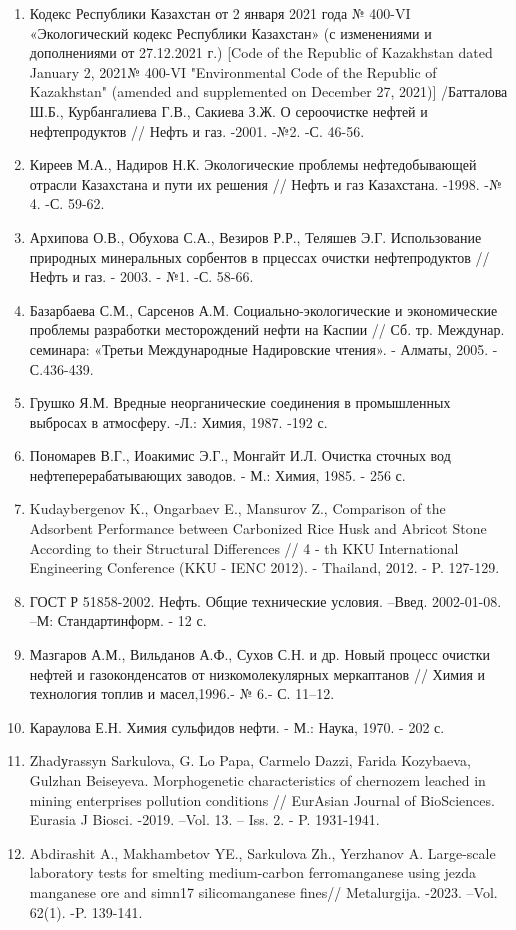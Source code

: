\begin{enumerate}
\def\labelenumi{\arabic{enumi}.}
\item
  Кодекс Республики Казахстан от 2 января 2021 года № 400-VI
  «Экологический кодекс Республики Казахстан» (с изменениями и
  дополнениями от 27.12.2021 г.) {[}Code of the Republic of Kazakhstan
  dated January 2, 2021№ 400-VI "Environmental Code of the Republic of
  Kazakhstan" (amended and supplemented on December 27, 2021){]}
  /Батталова Ш.Б., Курбангалиева Г.В., Сакиева З.Ж. О сероочистке нефтей
  и нефтепродуктов // Нефть и газ. -2001. -№2. -С. 46-56.
\item
  Киреев М.А., Надиров Н.К. Экологические проблемы нефтедобывающей
  отрасли Казахстана и пути их решения // Нефть и газ Казахстана. -1998.
  -№ 4. -С. 59-62.
\item
  Архипова О.В., Обухова С.А., Везиров Р.Р., Теляшев Э.Г. Использование
  природных минеральных сорбентов в прцессах очистки нефтепродуктов //
  Нефть и газ. - 2003. - №1. -С. 58-66.
\item
  Базарбаева С.М., Сарсенов А.М. Социально-экологические и экономические
  проблемы разработки месторождений нефти на Каспии // Сб. тр. Междунар.
  семинара: «Третьи Международные Надировские чтения». - Алматы, 2005. -
  С.436-439.
\item
  Грушко Я.М. Вредные неорганические соединения в промышленных выбросах
  в атмосферу. -Л.: Химия, 1987. -192 с.
\item
  Пономарев В.Г., Иоакимис Э.Г., Монгайт И.Л. Очистка сточных вод
  нефтеперерабатывающих заводов. - М.: Химия, 1985. - 256 с.
\item
  Kudaybergenov K., Ongarbaev E., Mansurov Z., Comparison of the
  Adsorbent Performance between Carbonized Rice Husk and Abricot Stone
  According to their Structural Differences // 4 - th KKU International
  Engineering Conference (KKU - IENC 2012). - Thailand, 2012. - P.
  127-129.
\item
  ГОСТ Р 51858-2002. Нефть. Общие технические условия. --Введ.
  2002-01-08. --М: Стандартинформ. - 12 с.
\item
  Мазгаров А.М., Вильданов А.Ф., Сухов С.Н. и др. Новый процесс очистки
  нефтей и газоконденсатов от низкомолекулярных меркаптанов // Химия и
  технология топлив и масел,1996.- № 6.- С. 11--12.
\item
  Караулова Е.Н. Химия сульфидов нефти. - М.: Наука, 1970. - 202 с.
\item
  Zhadуrassyn Sarkulova, G. Lo Papa, Carmelo Dazzi, Farida Kozybaeva,
  Gulzhan Beiseyeva. Morphogenetic characteristics of chernozem leached
  in mining enterprises pollution conditions // EurAsian Journal of
  BioSciences. Eurasia J Biosci. -2019. --Vol. 13. -- Iss. 2. - P.
  1931-1941.
\item
  Abdirashit A., Makhambetov YE., Sarkulova Zh., Yerzhanov A.
  Large-scale laboratory tests for smelting medium-carbon ferromanganese
  using jezda manganese ore and simn17 silicomanganese fines//
  Metalurgija. -2023. --Vol. 62(1). -P. 139-141.
\end{enumerate}


